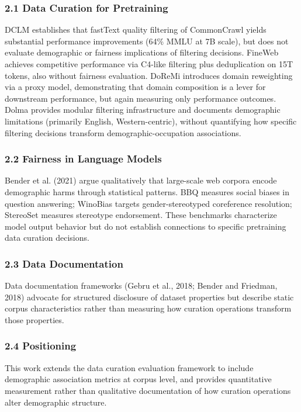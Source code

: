 
\subsubsection{2.1 Data Curation for Pretraining}

DCLM \citep{Li2024DCLM} establishes that fastText quality filtering of CommonCrawl yields substantial performance improvements (64\% MMLU at 7B scale), but does not evaluate demographic or fairness implications of filtering decisions. FineWeb \citep{Penedo2024FineWeb} achieves competitive performance via C4-like filtering plus deduplication on 15T tokens, also without fairness evaluation. DoReMi \citep{Xie2023DoReMi} introduces domain reweighting via a proxy model, demonstrating that domain composition is a lever for downstream performance, but again measuring only performance outcomes. Dolma \citep{Soldaini2024Dolma} provides modular filtering infrastructure and documents demographic limitations (primarily English, Western-centric), without quantifying how specific filtering decisions transform demographic-occupation associations.

\subsubsection{2.2 Fairness in Language Models}

Bender et al. (2021) argue qualitatively that large-scale web corpora encode demographic harms through statistical patterns. BBQ \citep{Parrish2022BBQ} measures social biases in question answering; WinoBias \citep{Zhao2018WinoBias} targets gender-stereotyped coreference resolution; StereoSet \citep{Nadeem2021StereoSet} measures stereotype endorsement. These benchmarks characterize model output behavior but do not establish connections to specific pretraining data curation decisions.

\subsubsection{2.3 Data Documentation}

Data documentation frameworks (Gebru et al., 2018; Bender and Friedman, 2018) advocate for structured disclosure of dataset properties but describe static corpus characteristics rather than measuring how curation operations transform those properties.

\subsubsection{2.4 Positioning}

This work extends the data curation evaluation framework to include demographic association metrics at corpus level, and provides quantitative measurement rather than qualitative documentation of how curation operations alter demographic structure.

